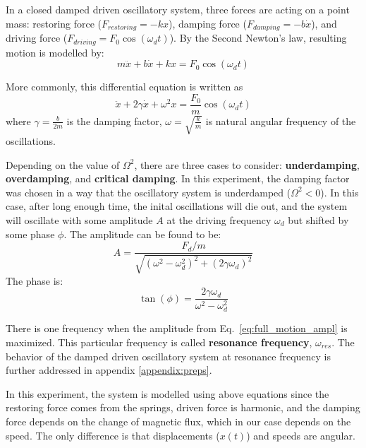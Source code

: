 In a closed damped driven oscillatory system, three forces are acting on a point mass: restoring force ($F_{restoring} = -kx$), damping force ($F_{damping} = -b\dot{x}$), and driving force ($F_{driving} = F_0 \cos(\omega_d t)$). By the Second Newton's law, resulting motion is modelled by:
\begin{equation*}
    m\ddot{x} + b\dot{x} + kx = F_0 \cos(\omega_d t)
\end{equation*}

More commonly, this differential equation is written as
\begin{equation} \label{eq:full_motion}
    \ddot{x} + 2\gamma \dot{x} + \omega^2 x = \frac{F_0}{m} \cos(\omega_d t)
\end{equation} where $\gamma = \frac{b}{2m}$ is the damping factor, $\omega = \sqrt{\frac{k}{m}}$ is natural angular frequency of the oscillations.

Depending on the value of $\Omega^2$, there are three cases to consider: \textbf{underdamping}, \textbf{overdamping}, and \textbf{critical damping}. In this experiment, the damping factor was chosen in a way that the oscillatory system is underdamped ($\Omega^2 < 0$). In this case, after long enough time, the inital oscillations will die out, and the system will oscillate with some amplitude $A$ at the driving frequency $\omega_d$ but shifted by some phase $\phi$.
The amplitude can be found to be:
\begin{equation} \label{eq:full_motion_ampl}
  A = \frac{ F_d/m  }{ \sqrt{ (\omega^2 - \omega_d^2)^2 + (2\gamma \omega_d)^2 } }
\end{equation}
The phase is:
\begin{equation} \label{eq:full_motion_phase}
  \tan(\phi) = \frac{2 \gamma \omega_d}{\omega^2 - \omega_d^2}
\end{equation}

There is one frequency when the amplitude from Eq.~\eqref{eq:full_motion_ampl} is maximized. This particular frequency is called \textbf{resonance frequency}, $\omega_{res}$. The behavior of the damped driven oscillatory system at resonance frequency is further addressed in appendix \ref{appendix:preps}.  

In this experiment, the system is modelled using above equations since the restoring force comes from the springs, driven force is harmonic, and the damping force depends on the change of magnetic flux, which in our case depends on the speed. The only difference is that displacements ($x(t)$) and speeds are angular.  
